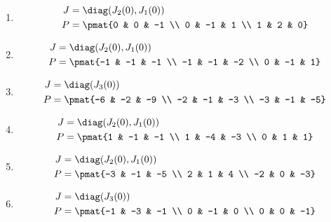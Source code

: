 \begin{enumerate}
\item

\begin{align*}
J &= \diag(J_{2}(0), J_{1}(0))\\
P &= \pmat{0 & 0 & -1 \\ 0 & -1 & 1 \\ 1 & 2 & 0}
\end{align*}

\item

\begin{align*}
J &= \diag(J_{2}(0), J_{1}(0))\\
P &= \pmat{-1 & -1 & -1 \\ -1 & -1 & -2 \\ 0 & -1 & 1}
\end{align*}

\item

\begin{align*}
J &= \diag(J_{3}(0))\\
P &= \pmat{-6 & -2 & -9 \\ -2 & -1 & -3 \\ -3 & -1 & -5}
\end{align*}

\item

\begin{align*}
J &= \diag(J_{2}(0), J_{1}(0))\\
P &= \pmat{1 & -1 & -1 \\ 1 & -4 & -3 \\ 0 & 1 & 1}
\end{align*}

\item

\begin{align*}
J &= \diag(J_{2}(0), J_{1}(0))\\
P &= \pmat{-3 & -1 & -5 \\ 2 & 1 & 4 \\ -2 & 0 & -3}
\end{align*}

\item

\begin{align*}
J &= \diag(J_{3}(0))\\
P &= \pmat{-1 & -3 & -1 \\ 0 & -1 & 0 \\ 0 & 0 & -1}
\end{align*}


\end{enumerate}
